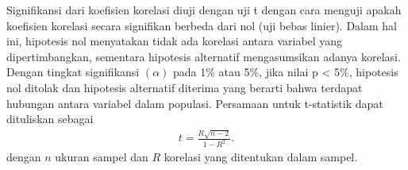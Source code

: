 \begin{spacing}{1.5}
		Signifikansi dari koefisien korelasi diuji dengan uji t dengan cara menguji apakah koefisien korelasi secara signifikan berbeda dari nol (uji bebas linier). Dalam hal ini, hipotesis nol menyatakan tidak ada korelasi antara variabel yang dipertimbangkan, sementara hipotesis alternatif mengasumsikan adanya korelasi. Dengan tingkat signifikansi $(\alpha)$ pada 1\% atau 5\%, jika nilai p < 5\%, hipotesis nol ditolak dan hipotesis alternatif diterima yang berarti bahwa terdapat hubungan antara variabel dalam populasi. Persamaan untuk t-statistik dapat dituliskan sebagai
		\begin{equation}
			\begin{aligned}
				t=\frac{R\sqrt{n-2}}{1-R^2}.
			\end{aligned}
		\end{equation}
		dengan $n$ ukuran sampel dan $R$ korelasi yang ditentukan dalam sampel.

\end{spacing}
